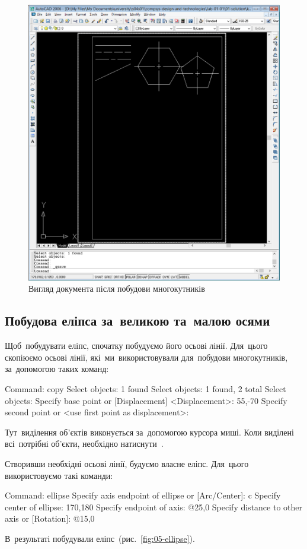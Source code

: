 \documentclass[
	a4paper,
	oneside,
	BCOR = 10mm,
	DIV = 12,
	12pt,
	headings = normal,
]{scrartcl}
\begin{document}
			\begin{figure}[!htbp]
				\centering
				\includegraphics[height=19\baselineskip]{./assets/y04s01-csdt-lab-01-01-p06.png}
				\caption{Вигляд документа після побудови многокутників}
				\label{fig:04-polygons}
			\end{figure}

		\subsection{Побудова еліпса за~великою та~малою осями}
			Щоб~побудувати еліпс, спочатку побудуємо його осьові лінії. Для~цього скопіюємо осьові лінії, які~ми~використовували для~побудови многокутників, за~допомогою таких команд:
			\begin{codegeneric}
				Command: copy
				Select objects: 1 found
				Select objects: 1 found, 2 total
				Select objects:
				Specify base point or [Displacement] <Displacement>: 55,-70
				Specify second point or <use first point as displacement>:
			\end{codegeneric}
			Тут~виділення об'єктів виконується за~допомогою курсора миші. Коли виділені всі~потрібні об'єкти, необхідно натиснути~\keys{\return}.

			Створивши необхідні осьові лінії, будуємо власне еліпс. Для~цього використовуємо такі команди:
			\begin{codegeneric}
				Command: ellipse
				Specify axis endpoint of ellipse or [Arc/Center]: c
				Specify center of ellipse: 170,180
				Specify endpoint of axis: @25,0
				Specify distance to other axis or [Rotation]: @15,0
			\end{codegeneric}
			В~результаті побудували еліпс~(рис.~\ref{fig:05-ellipse}).
\end{document}
